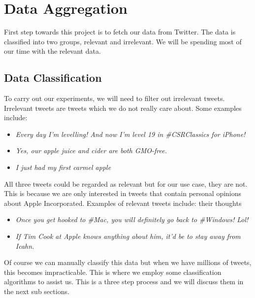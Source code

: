 
\chapter{Data Aggregation}
First step towards this project is to fetch our data from Twitter. The data is classified into two
groups, relevant and irrelevant. We will be spending most of our time with the relevant data.


\section{Data Classification}
\label{sec:data_classification}
To carry out our experiments, we will need to filter out irrelevant tweets. Irrelevant tweets are
tweets which we do not really care about. Some examples include:

\begin{itemize}
  \item \textit{Every day I'm levelling! And now I'm level 19 in \#CSRClassics for iPhone!}
  \item \textit{Yes, our apple juice and cider are both GMO-free.}
  \item \textit{I just had my first carmel apple}
\end{itemize}

All three tweets could be regarded as relevant but for our use case, they are not. This is because
we are only interested in tweets that contain personal opinions about Apple Incorporated. Examples
of relevant tweets include: their thoughts
\begin{itemize}
  \item \textit{Once you get hooked to \#Mac, you will definitely go back to \#Windows! Lol!}
  \item \textit{If Tim Cook at Apple knows anything about him, it'd be to stay away from Icahn.}
\end{itemize}

Of course we can manually classify this data but when we have millions of tweets, this becomes
impracticable. This is where we employ some classification algorithms to assist us. This is a
three step process and we will discuss them in the next sub sections.

